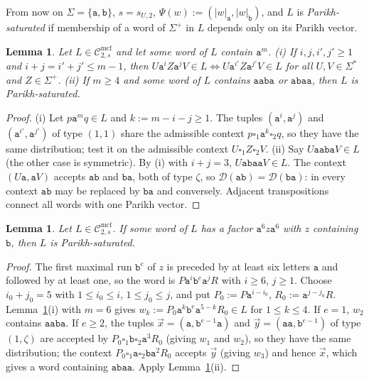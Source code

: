 \documentclass[11pt]{article}
\numberwithin{equation}{section}
\theoremstyle{plain}
\newtheorem{lemma}[theorem]{Lemma}
\theoremstyle{definition}
\theoremstyle{remark}
\newcommand{\Cmcf}[2]{\mathcal{C}^{\mathrm{mcf}}_{#1,#2}}
\newcommand{\D}{\mathcal{D}}
\newcommand{\tuple}[1]{\vec{#1}}
\newcommand{\blank}{\square}
\theoremstyle{plain}
\begin{document}
From now on $\Sigma=\{\mathtt a,\mathtt b\}$, $s=s_{U,2}$, $\Psi(w):=(|w|_{\mathtt a},|w|_{\mathtt b})$,
and $L$ is \emph{Parikh-saturated} if membership of a word of $\Sigma^+$ in $L$
depends only on its Parikh vector.

\begin{lemma}\label{lem:app-u1-transfer}
Let $L\in\Cmcf{2}{s}$ and let some word of $L$ contain $\mathtt a^m$.
\textup{(i)} If $i,j,i',j'\ge1$ and $i+j=i'+j'\le m-1$, then
$U\mathtt a^iZ\mathtt a^jV\in L\iff U\mathtt a^{i'}Z\mathtt a^{j'}V\in L$ for all
$U,V\in\Sigma^*$ and $Z\in\Sigma^+$.
\textup{(ii)} If $m\ge4$ and some word of $L$ contains $\mathtt a\mathtt a\mathtt b\mathtt a$
or $\mathtt a\mathtt b\mathtt a\mathtt a$, then $L$ is Parikh-saturated.
\end{lemma}

\begin{proof}
(i) Let $p\mathtt a^mq\in L$ and $k:=m-i-j\ge1$.  The tuples $(\mathtt a^i,\mathtt a^j)$ and
$(\mathtt a^{i'},\mathtt a^{j'})$ of type $(1,1)$ share the admissible context
$p\blank_1\mathtt a^k\blank_2q$, so they have the same distribution; test it on the
admissible context $U\blank_1Z\blank_2V$.
(ii) Say $U\mathtt a\mathtt a\mathtt b\mathtt a V\in L$ (the other case is symmetric).  By (i)
with $i+j=3$, $U\mathtt a\mathtt b\mathtt a\mathtt aV\in L$.  The context $(U\mathtt a,\mathtt aV)$
accepts $\mathtt{ab}$ and $\mathtt{ba}$, both of type $\zeta$, so
$\D(\mathtt{ab})=\D(\mathtt{ba})$: in every context $\mathtt{ab}$ may be replaced by
$\mathtt{ba}$ and conversely.  Adjacent transpositions connect all words with one
Parikh vector.
\end{proof}

\begin{lemma}\label{lem:app-u1-deep}
Let $L\in\Cmcf{2}{s}$.  If some word of $L$ has a factor $\mathtt a^6z\mathtt a^6$ with $z$
containing $\mathtt b$, then $L$ is Parikh-saturated.
\end{lemma}

\begin{proof}
The first maximal run $\mathtt b^e$ of $z$ is preceded by at least six letters
$\mathtt a$ and followed by at least one, so the word is
$P\mathtt a^i\mathtt b^e\mathtt a^jR$ with $i\ge6$, $j\ge1$.  Choose $i_0+j_0=5$ with
$1\le i_0\le i$, $1\le j_0\le j$, and put $P_0:=P\mathtt a^{i-i_0}$,
$R_0:=\mathtt a^{j-j_0}R$.  Lemma~\ref{lem:app-u1-transfer}(i) with $m=6$ gives
$w_k:=P_0\mathtt a^k\mathtt b^e\mathtt a^{5-k}R_0\in L$ for $1\le k\le4$.  If $e=1$, $w_2$
contains $\mathtt{aaba}$.  If $e\ge2$, the tuples $\tuple x=(\mathtt a,\mathtt b^{e-1}\mathtt a)$
and $\tuple y=(\mathtt a\mathtt a,\mathtt b^{e-1})$ of type $(1,\zeta)$ are accepted by
$P_0\blank_1\mathtt b\blank_2\mathtt a^3R_0$ (giving $w_1$ and $w_2$), so they have the
same distribution; the context $P_0\blank_1\mathtt a\blank_2\mathtt b\mathtt a^2R_0$ accepts
$\tuple y$ (giving $w_3$) and hence $\tuple x$, which gives a word containing
$\mathtt{abaa}$.  Apply Lemma~\ref{lem:app-u1-transfer}(ii).
\end{proof}
\end{document}
